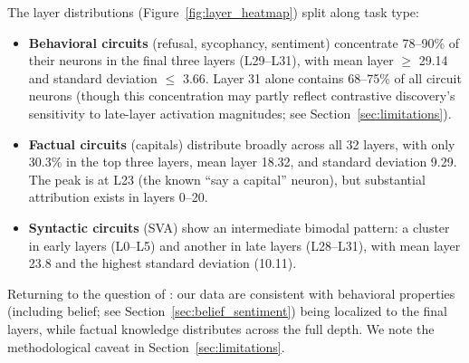 \documentclass[11pt]{article}
\begin{document}
The layer distributions (Figure~\ref{fig:layer_heatmap}) split along task type:

\begin{itemize}[leftmargin=2em]
    \item \textbf{Behavioral circuits} (refusal, sycophancy, sentiment) concentrate 78--90\% of their neurons in the final three layers (L29--L31), with mean layer $\geq$ 29.14 and standard deviation $\leq$ 3.66. Layer 31 alone contains 68--75\% of all circuit neurons (though this concentration may partly reflect contrastive discovery's sensitivity to late-layer activation magnitudes; see Section~\ref{sec:limitations}).

    \item \textbf{Factual circuits} (capitals) distribute broadly across all 32 layers, with only 30.3\% in the top three layers, mean layer 18.32, and standard deviation 9.29. The peak is at L23 (the known ``say a capital'' neuron), but substantial attribution exists in layers 0--20.

    \item \textbf{Syntactic circuits} (SVA) show an intermediate bimodal pattern: a cluster in early layers (L0--L5) and another in late layers (L28--L31), with mean layer 23.8 and the highest standard deviation (10.11).
\end{itemize}

Returning to the question of \citet{chalnick2025goodfire}: our data are consistent with behavioral properties (including belief; see Section~\ref{sec:belief_sentiment}) being localized to the final layers, while factual knowledge distributes across the full depth. We note the methodological caveat in Section~\ref{sec:limitations}.
\end{document}
